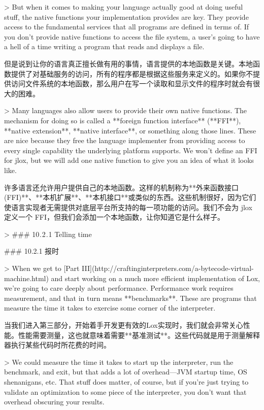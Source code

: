 \documentclass[cn,11pt,chinese]{elegantbook}
\begin{document}
> But when it comes to making your language actually good at doing useful stuff, the native functions your implementation provides are key. They provide access to the fundamental services that all programs are defined in terms of. If you don’t provide native functions to access the file system, a user’s going to have a hell of a time writing a program that reads and displays a file.

但是说到让你的语言真正擅长做有用的事情，语言提供的本地函数是关键。本地函数提供了对基础服务的访问，所有的程序都是根据这些服务来定义的。如果你不提供访问文件系统的本地函数，那么用户在写一个读取和显示文件的程序时就会有很大的困难。

> Many languages also allow users to provide their own native functions. The mechanism for doing so is called a **foreign function interface** (**FFI**), **native extension**, **native interface**, or something along those lines. These are nice because they free the language implementer from providing access to every single capability the underlying platform supports. We won’t define an FFI for jlox, but we will add one native function to give you an idea of what it looks like.

许多语言还允许用户提供自己的本地函数。这样的机制称为**外来函数接口(FFI)**、**本机扩展**、**本机接口**或类似的东西。这些机制很好，因为它们使语言实现者无需提供对底层平台所支持的每一项功能的访问。我们不会为 jlox 定义一个 FFI，但我们会添加一个本地函数，让你知道它是什么样子。

> ### 10 . 2 . 1 Telling time

### 10.2.1 报时

> When we get to [Part III](http://craftinginterpreters.com/a-bytecode-virtual-machine.html) and start working on a much more efficient implementation of Lox, we’re going to care deeply about performance. Performance work requires measurement, and that in turn means **benchmarks**. These are programs that measure the time it takes to exercise some corner of the interpreter.

当我们进入第三部分，开始着手开发更有效的Lox实现时，我们就会非常关心性能。性能需要测量，这也就意味着需要**基准测试**。这些代码就是用于测量解释器执行某些代码时所花费的时间。

> We could measure the time it takes to start up the interpreter, run the benchmark, and exit, but that adds a lot of overhead—JVM startup time, OS shenanigans, etc. That stuff does matter, of course, but if you’re just trying to validate an optimization to some piece of the interpreter, you don’t want that overhead obscuring your results.
\end{document}
